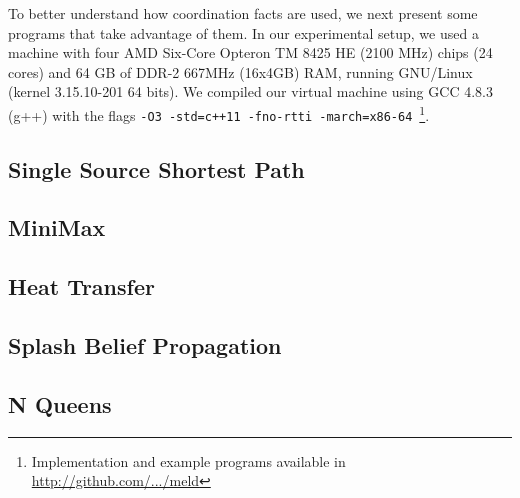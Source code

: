 
To better understand how coordination facts are used, we next present some programs that
take advantage of them. In our experimental setup, we used a machine with
four AMD Six-Core Opteron TM 8425 HE (2100 MHz) chips (24 cores) and 64 GB of
DDR-2 667MHz (16x4GB) RAM, running GNU/Linux (kernel 3.15.10-201 64 bits).
We compiled our virtual machine using GCC 4.8.3 (g++) with the flags
\texttt{-O3 -std=c++11 -fno-rtti -march=x86-64}~\footnote{Implementation and
   example programs available in \url{http://github.com/.../meld}}.

\subsection{Single Source Shortest Path}


\subsection{MiniMax}


\subsection{Heat Transfer}


\subsection{Splash Belief Propagation}


\subsection{N Queens}

